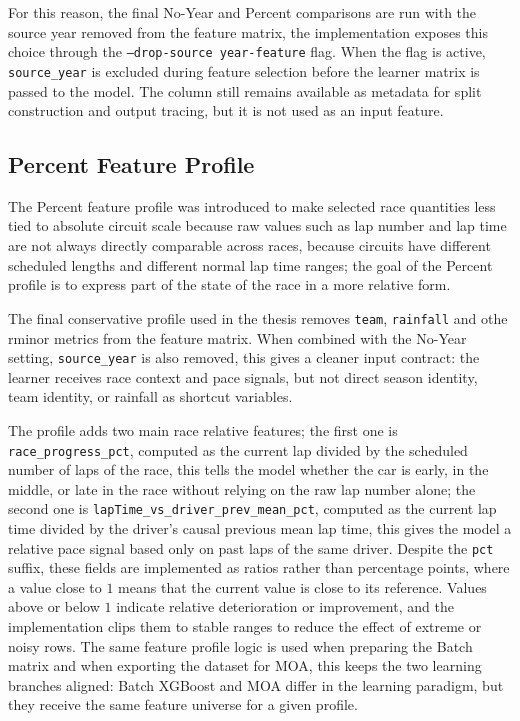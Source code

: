 For this reason, the final No-Year and Percent comparisons are run with the source year removed from the feature matrix, the implementation exposes this choice through the
\texttt{--drop-source year-feature} flag. When the flag is active, \texttt{source\_year} is excluded during feature selection before the learner matrix is passed to the model.
The column still remains available as metadata for split construction and output tracing, but it is not used as an input feature.

\subsection{Percent Feature Profile}
\label{sec:percent_feature_profile}

The Percent feature profile was introduced to make selected race quantities less tied to absolute circuit scale because raw values such as lap number and lap time are not always
directly comparable across races, because circuits have different scheduled lengths and different normal lap time ranges; the goal of the Percent profile is
to express part of the state of the race in a more relative form.

The final conservative profile used in the thesis removes \texttt{team}, \texttt{rainfall} and othe rminor metrics from the feature matrix.
When combined with the No-Year setting, \texttt{source\_year} is also removed, this gives a cleaner input contract: the learner receives race context and pace signals,
but not direct season identity, team identity, or rainfall as shortcut variables.

The profile adds two main race relative features; the first one is \texttt{race\_progress\_pct}, computed as the current lap divided by the scheduled number of laps of the race,
this tells the model whether the car is early, in the middle, or late in the race without relying on the raw lap number alone; the second one is \texttt{lapTime\_vs\_driver\_prev\_mean\_pct},
computed as the current lap time divided by the driver's causal previous mean lap time, this gives the model a relative pace signal based only on past laps of the same driver.
Despite the \texttt{pct} suffix, these fields are implemented as ratios rather than percentage points, where a value close to $1$ means that the current value is close to its reference.
Values above or below $1$ indicate relative deterioration or improvement, and the implementation clips them to stable ranges to reduce the effect of extreme or noisy rows.
The same feature profile logic is used when preparing the Batch matrix and when exporting the dataset for MOA, this keeps the two learning branches aligned: Batch XGBoost and MOA differ
in the learning paradigm, but they receive the same feature universe for a given profile.



